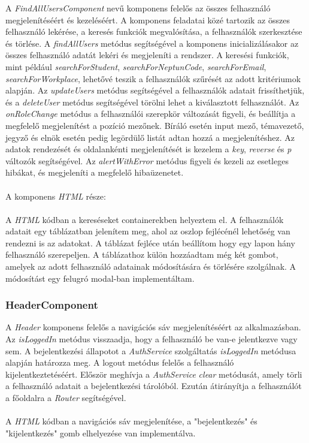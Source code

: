 A \textit{FindAllUsersComponent} nevű komponens felelős az összes felhasználó megjelenítéséért és kezeléséért. A komponens feladatai közé tartozik az összes felhasználó lekérése, a keresés funkciók megvalósítása, a felhasználók szerkesztése és törlése. A \textit{findAllUsers} metódus segítségével a komponens inicializálásakor az összes felhasználó adatát lekéri és megjeleníti a rendszer. A keresési funkciók, mint például \textit{searchForStudent}, \textit{searchForNeptunCode}, \textit{searchForEmail}, \textit{searchForWorkplace}, lehetővé teszik a felhasználók szűrését az adott kritériumok alapján.  Az \textit{updateUsers} metódus segítségével a felhasználók adatait frissíthetjük, és a \textit{deleteUser} metódus segítségével törölni lehet a kiválasztott felhasználót. Az \textit{onRoleChange} metódus a felhasználói szerepkör változását figyeli, és beállítja a megfelelő megjelenítést a pozíció mezőnek. Bíráló esetén input mező, témavezető, jegyző és elnök esetén pedig legördülő listát adtan hozzá a megjelenítéshez. Az adatok rendezését és oldalankénti megjelenítését is kezelem a \textit{key}, \textit{reverse} és \textit{p} változók segítségével. Az \textit{alertWithError} metódus figyeli és kezeli az esetleges hibákat, és megjeleníti a megfelelő hibaüzenetet.\\
\\
A komponens \textit{HTML} része:\\
\\
A \textit{HTML} kódban a kereséseket containerekben helyeztem el. A felhasználók adatait egy táblázatban jelenítem meg, ahol az oszlop fejlécénél lehetőség van rendezni is az adatokat. A táblázat fejléce után beállítom hogy egy lapon hány felhasználó szerepeljen. A táblázathoz külön hozzáadtam még két gombot, amelyek az adott felhasználó adatainak módosítására és törlésére szolgálnak. A módosítást egy felugró modal-ban implementáltam.


\subsubsection{HeaderComponent}

A \textit{Header} komponens felelős a navigációs sáv megjelenítéséért az alkalmazásban. Az \textit{isLoggedIn} metódus visszaadja, hogy a felhasználó be van-e jelentkezve vagy sem. A bejelentkezési állapotot a \textit{AuthService} szolgáltatás \textit{isLoggedIn} metódusa alapján határozza meg. A logout metódus felelős a felhasználó kijelentkeztetéséért. Először meghívja a \textit{AuthService} \textit{clear} metódusát, amely törli a felhasználó adatait a bejelentkezési tárolóból. Ezután átirányítja a felhasználót a főoldalra a \textit{Router} segítségével.\\
\\
A \textit{HTML} kódban a navigációs sáv megjelenítése, a "bejelentkezés" és "kijelentkezés" gomb elhelyezése van implementálva.


